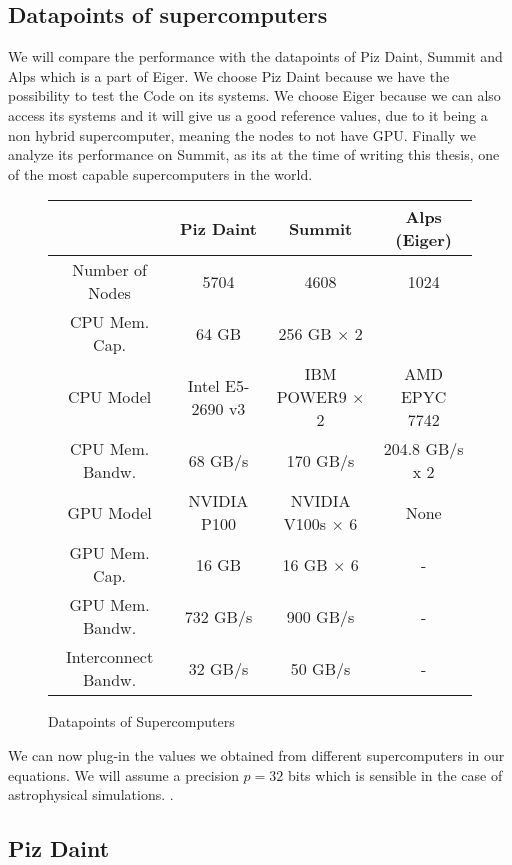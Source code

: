 \documentclass[]{article}
\begin{document}
\subsection{Datapoints of supercomputers}

We will compare the performance with the datapoints of Piz Daint, Summit and Alps which is a part of Eiger. We choose Piz Daint because we have the possibility to test the Code on its systems. We choose Eiger because we can also access its systems and it will give us a good reference values, due to it being a non hybrid supercomputer, meaning the nodes to not have GPU. Finally we analyze its performance on Summit, as its at the time of writing this thesis, one of the most capable supercomputers in the world.

\small
\begin{figure}[H]
	\begin{center}
		\begin{tabular}{ c c c c }
			& Piz Daint \cite{piz_daint} & Summit & Alps (Eiger) \\ 
			\hline
			Number of Nodes & 5704 & 4608 & 1024\\
			CPU Mem. Cap. & 64 GB & 256 GB $\times$ 2  \\   
			CPU Model & Intel E5-2690 v3 & IBM POWER9 $\times$ 2 & AMD EPYC 7742 \\
			CPU Mem. Bandw.  & 68 GB/s & 170 GB/s & 204.8 GB/s x 2	\\
			GPU Model & NVIDIA P100 & NVIDIA V100s  $\times$ 6 & None \\
			GPU Mem. Cap. & 16 GB & 16 GB $\times$ 6 & -\\
			GPU Mem. Bandw. & 732 GB/s & 900 GB/s & -\\
			Interconnect Bandw. & 32 GB/s & 50 GB/s & -\\
		\end{tabular}
	\end{center}
\caption{Datapoints of Supercomputers}
\label{fig:datapoints}
\end{figure}

We can now plug-in the values we obtained from different supercomputers in our equations.  We will assume a precision $p = 32$ bits which is sensible in the case of astrophysical simulations. .

\normalfont
\subsection{Piz Daint} 
\end{document}
